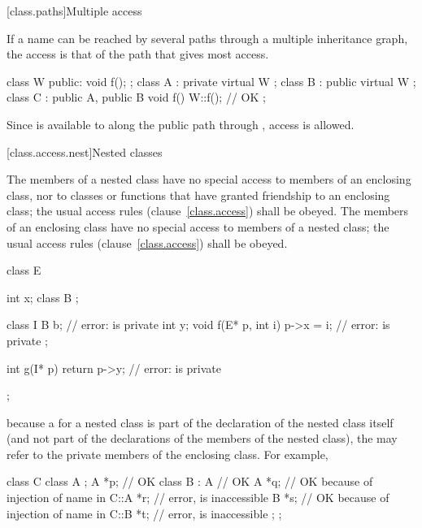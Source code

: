 [class.paths]{Multiple access}%

\pnum
If a name can be reached by several paths through a multiple inheritance
graph, the access is that of the path that gives most access.
\enterexample

\begin{codeblock}
class W { public: void f(); };
class A : private virtual W { };
class B : public virtual W { };
class C : public A, public B {
    void f() { W::f(); }        // OK
};
\end{codeblock}

Since
is available to
along the public path through
,
access is allowed.
\exitexample

[class.access.nest]{Nested classes}%
%

\pnum
The members of a nested class have no special access to members of an
enclosing class, nor to classes or functions that have granted friendship
to an enclosing class; the usual access rules (clause~\ref{class.access})
shall be obeyed.
The members of an enclosing class have no special access to members of a nested
class; the usual access rules (clause~\ref{class.access}) shall be obeyed.
\enterexample
{}%

\begin{codeblock}
class E {
    int x;
    class B { };

    class I {
	B b;                    // error:  is private
	int y;
	void f(E* p, int i)
	{
	    p->x = i;           // error:  is private
	}
    };

    int g(I* p)
    {
	return p->y;            // error:  is private
    }
};
\end{codeblock}
\exitexampleb

\pnum
\enternote
because a  for a nested class is part of the
declaration of the nested class itself (and not part of the declarations
of the members of the nested class), the  may
refer to the private members of the enclosing class. For example,

\begin{codeblock}
class C {
	class A { };
	A *p;			// OK
	class B : A		// OK
	{
		A *q;		// OK because of injection of name \tcode{A} in 
		C::A *r;	// error,  is inaccessible
		B *s;		// OK because of injection of name \tcode{B} in 
		C::B *t;	// error,  is inaccessible
	};
};
\end{codeblock}

\exitnoteb%
